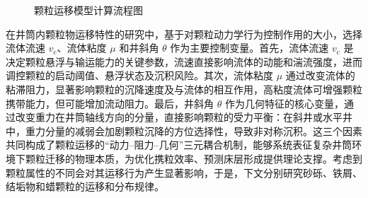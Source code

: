 \begin{figure}[htbp]
        \caption{颗粒运移模型计算流程图}
        \label{fig:flowchart}  
    \end{figure}


在井筒内颗粒物运移特性的研究中，基于对颗粒动力学行为控制作用的大小，选择流体流速 \(v_{\mathrm{c}}\)、流体粘度 \(\mu\) 和井斜角 \(\theta\) 作为主要控制变量。首先，流体流速 \(v_{\mathrm{c}}\) 是决定颗粒悬浮与输运能力的关键参数，流速直接影响流体的动能和湍流强度，进而调控颗粒的启动阈值、悬浮状态及沉积风险。其次，流体粘度 \(\mu\) 通过改变流体的粘滞阻力，显著影响颗粒的沉降速度及与流体的相互作用，高粘度流体可增强颗粒携带能力，但可能增加流动阻力。最后，井斜角 \(\theta\) 作为几何特征的核心变量，通过改变重力在井筒轴线方向的分量，直接影响颗粒的受力平衡：在斜井或水平井中，重力分量的减弱会加剧颗粒沉降的方位选择性，导致非对称沉积。这三个因素共同构成了颗粒运移的“动力--阻力--几何”三元耦合机制，能够系统表征复杂井筒环境下颗粒迁移的物理本质，为优化携粒效率、预测床层形成提供理论支撑。考虑到颗粒属性的不同会对其运移行为产生显著影响，于是，下文分别研究砂砾、铁屑、结垢物和蜡颗粒的运移和分布规律。

